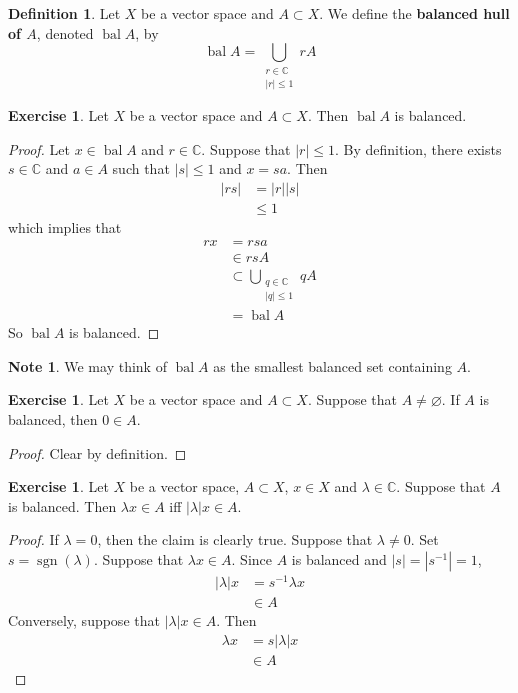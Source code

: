 \documentclass[12pt]{amsart}
\theoremstyle{definition}
\newtheorem{defn}[definition]{Definition}
\newtheorem{note}[definition]{Note}
\newtheorem{ex}[definition]{Exercise}
\newcommand{\lam}{\lambda}
\newcommand{\C}{\mathbb{C}}
\newcommand{\tbf}[1]{\textbf{#1}}
\DeclareMathOperator{\sgn}{sgn}
\DeclareMathOperator{\bal}{bal}
\DeclareMathOperator*{\0}{\mbf{0}}
\DeclareMathOperator*{\1}{\mbf{1}}
\begin{document}
	\begin{defn}
		Let $X$ be a vector space and $A \subset X$. We define the \tbf{balanced hull of $A$}, denoted $\bal A$, by $$\bal A = \bigcup_{\substack{r \in \C \\ |r| \leq 1}} rA$$
	\end{defn}

	\begin{ex}
		Let $X$ be a vector space and $A \subset X$. Then $\bal A$ is balanced. 
	\end{ex}

	\begin{proof}
		Let $x \in \bal A$ and $r \in \C$. Suppose that $|r| \leq 1$. By definition, there exists $s \in \C$ and $a \in A$ such that $|s| \leq 1$ and $x = sa$. Then 
		\begin{align*}
			|rs| 
			&= |r||s| \\
			&\leq 1
		\end{align*}
		which implies that
		\begin{align*}
			rx 
			&= rsa \\
			& \in rsA \\
			& \subset \bigcup_{\substack{q \in \C \\ |q| \leq 1}} qA \\
			&= \bal A
		\end{align*}
		So $\bal A$ is balanced.
	\end{proof}
	
	\begin{note}
		We may think of $\bal A$ as the smallest balanced set containing $A$. 
	\end{note}
	
	\begin{ex}
		Let $X$ be a vector space and $A \subset X$. Suppose that $A \neq \varnothing$. If $A$ is balanced, then $0 \in A$.
	\end{ex}
	
	\begin{proof}
		Clear by definition.
	\end{proof}

	\begin{ex}
		Let $X$ be a vector space, $A \subset X$, $x \in X$ and $\lam \in \C$. Suppose that $A$ is balanced. Then $\lam x \in A$ iff $|\lam| x \in A$.  
	\end{ex}
	
	\begin{proof}
		If $\lam = 0$, then the claim is clearly true. Suppose that $\lam \neq 0$. Set $s = \sgn(\lam)$. Suppose that $\lam x \in A$. Since $A$ is balanced and $|s| = |s^{-1}| = 1$, 
		\begin{align*}
			|\lam|x 
			&= s^{-1} \lam x \\
			& \in A
		\end{align*}
		Conversely, suppose that $|\lam| x \in A$. Then 
		\begin{align*}
			\lam x 
			&= s |\lam| x \\
			& \in A
		\end{align*}
	\end{proof}
\end{document}
